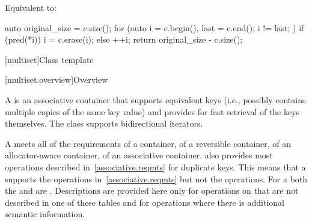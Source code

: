 \begin{itemdescr}
\pnum
\effects
Equivalent to:
\begin{codeblock}
auto original_size = c.size();
for (auto i = c.begin(), last = c.end(); i != last; ) {
  if (pred(*i)) {
    i = c.erase(i);
  } else {
    ++i;
  }
}
return original_size - c.size();
\end{codeblock}
\end{itemdescr}

[multiset]{Class template }

[multiset.overview]{Overview}

\pnum
{}%
A
is an associative container that supports equivalent keys (i.e., possibly contains multiple copies of
the same key value) and provides for fast retrieval of the keys themselves.
The
 class
supports bidirectional iterators.

\pnum
A  meets all of the requirements
of a container,
of a reversible container,
of an allocator-aware container,
of an associative container.
also provides most operations described in~\ref{associative.reqmts}
for duplicate keys.
This means that a
supports the
operations in~\ref{associative.reqmts}
but not the
operations.
For a
both the
and
are
.
Descriptions are provided here only for operations on
that are not described in one of these tables
and for operations where there is additional semantic information.

